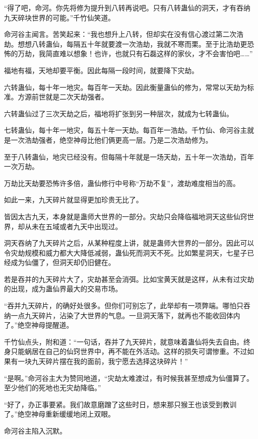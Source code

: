 \begin{this_body}
“得了吧，命河。你先将修为提升到八转再说吧。只有八转蛊仙的洞天，才有吞纳九天碎块世界的可能。”千竹仙笑道。

命河谷主闻言。苦笑起来：“我也想升上八转，但却实在没有信心渡过第二次浩劫。想想八转蛊仙，每隔五十年就要渡一次浩劫，我就不寒而栗。至于比浩劫更恐怖的万劫，我简直难以想象！也许，也就只有石磊这样的家伙，才不会害怕吧……”

福地有福，天地却要平衡。因此每隔一段时间，就要降下灾劫。

六转蛊仙，每十年一地灾。每百年一天劫。因此衡量蛊仙的修为，常常以天劫为标准。方源前世就是二次天劫强者。

六转蛊仙过了三次天劫之后，福地将扩张到另一种层次，就成为七转蛊仙。

七转蛊仙，每十年一地灾，每五十年一天劫。每百年一浩劫。千竹仙、命河谷主就是一次浩劫强者，绝空神母比他们俩更高一层。乃是二次浩劫修为。

至于八转蛊仙，地灾已经没有。但每隔十年就是一场天劫，五十年一次浩劫，百年一次万劫。

万劫比天劫要恐怖许多倍，蛊仙修行中号称“万劫不复”，渡劫难度相当的高。

如此一来，九天碎片就显得更加珍贵无比了。

皆因太古九天，本身就是蛊师大世界的一部分。灾劫只会降临福地洞天这些仙窍世界，却从未在五域或者九天中出现过。

洞天吞纳了九天碎片之后，从某种程度上讲，就是蛊师大世界的一部分。因此可以令灾劫规模和威力都大大降低减弱，蛊仙死而洞天不死。比如繁星洞天，七星子已经成为仙僵了，但洞天却仍旧健在。

若是吞并的九天碎片大了，灾劫甚至会消弭。比如宝黄天就是这样，从未有过灾劫的出现，成为蛊仙界最大的交易市场。

“吞并九天碎片，的确好处很多。但你们可别忘了，此举却有一项弊端。哪怕只吞纳一点九天碎片，沾染了大世界的气息。一旦洞天落下，就再也不能收回体内了。”绝空神母提醒道。

千竹仙点头，附和道：“一句话，吞并了九天碎片，就意味着蛊仙将失去自由。终身只能蜗居在自己的仙窍世界中，再不能在外活动。这样的损失可谓惨重。不过如果有一块九天碎片摆在我的面前，我宁愿去选择这块碎片！”

“是啊。”命河谷主大为赞同地道，“灾劫太难渡过，有时候我甚至想成为仙僵算了。至少他们的死地也无灾劫降临。”

“好了，办正事要紧。我们故意磨蹭了这些时日，想来那只猴王也该受到教训了。”绝空神母重新缓缓地闭上双眼。

命河谷主陷入沉默。


\end{this_body}
